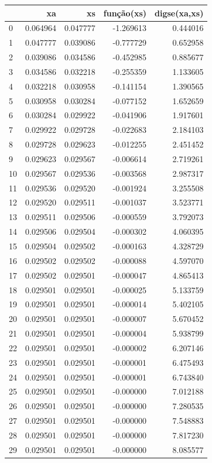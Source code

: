 \begin{tabular}{lrrrr}
\toprule
 & xa & xs & função(xs) & digse(xa,xs) \\
\midrule
0 & 0.064964 & 0.047777 & -1.269613 & 0.444016 \\
1 & 0.047777 & 0.039086 & -0.777729 & 0.652958 \\
2 & 0.039086 & 0.034586 & -0.452985 & 0.885677 \\
3 & 0.034586 & 0.032218 & -0.255359 & 1.133605 \\
4 & 0.032218 & 0.030958 & -0.141154 & 1.390565 \\
5 & 0.030958 & 0.030284 & -0.077152 & 1.652659 \\
6 & 0.030284 & 0.029922 & -0.041906 & 1.917601 \\
7 & 0.029922 & 0.029728 & -0.022683 & 2.184103 \\
8 & 0.029728 & 0.029623 & -0.012255 & 2.451452 \\
9 & 0.029623 & 0.029567 & -0.006614 & 2.719261 \\
10 & 0.029567 & 0.029536 & -0.003568 & 2.987317 \\
11 & 0.029536 & 0.029520 & -0.001924 & 3.255508 \\
12 & 0.029520 & 0.029511 & -0.001037 & 3.523771 \\
13 & 0.029511 & 0.029506 & -0.000559 & 3.792073 \\
14 & 0.029506 & 0.029504 & -0.000302 & 4.060395 \\
15 & 0.029504 & 0.029502 & -0.000163 & 4.328729 \\
16 & 0.029502 & 0.029502 & -0.000088 & 4.597070 \\
17 & 0.029502 & 0.029501 & -0.000047 & 4.865413 \\
18 & 0.029501 & 0.029501 & -0.000025 & 5.133759 \\
19 & 0.029501 & 0.029501 & -0.000014 & 5.402105 \\
20 & 0.029501 & 0.029501 & -0.000007 & 5.670452 \\
21 & 0.029501 & 0.029501 & -0.000004 & 5.938799 \\
22 & 0.029501 & 0.029501 & -0.000002 & 6.207146 \\
23 & 0.029501 & 0.029501 & -0.000001 & 6.475493 \\
24 & 0.029501 & 0.029501 & -0.000001 & 6.743840 \\
25 & 0.029501 & 0.029501 & -0.000000 & 7.012188 \\
26 & 0.029501 & 0.029501 & -0.000000 & 7.280535 \\
27 & 0.029501 & 0.029501 & -0.000000 & 7.548883 \\
28 & 0.029501 & 0.029501 & -0.000000 & 7.817230 \\
29 & 0.029501 & 0.029501 & -0.000000 & 8.085577 \\
\bottomrule
\end{tabular}
